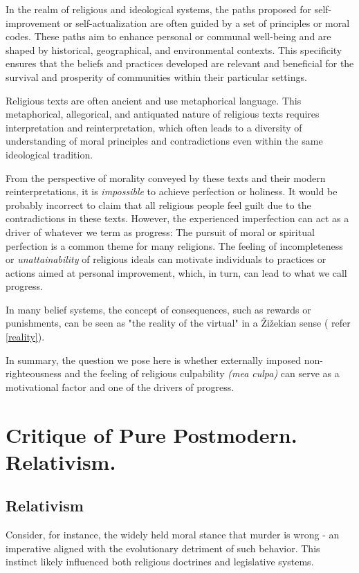 \documentclass[11pt,a4]{article}
\begin{document}
    In the realm of religious and ideological systems, the paths proposed for self-improvement or
    self-actualization are often guided by a set of principles or moral codes. These paths aim to
    enhance personal or communal well-being and are shaped by historical, geographical,
    and environmental contexts. This specificity ensures that the beliefs and practices developed
    are relevant and beneficial for the survival and prosperity of communities within their particular settings.

    Religious texts are often ancient and use metaphorical language. This metaphorical, allegorical, and antiquated nature of religious texts requires interpretation and reinterpretation, which often leads to a diversity of understanding of moral principles and contradictions even within the same ideological tradition.

    From the perspective of morality conveyed by these texts and their modern reinterpretations, it is \textit{impossible} to achieve perfection or holiness. It would be probably incorrect to claim that all religious people feel guilt due to the contradictions in these texts. However, the experienced imperfection can act as a driver of whatever we term as progress: The pursuit of moral or spiritual perfection is a common theme for many religions. The feeling of incompleteness or \textit{unattainability} of religious ideals can motivate individuals to practices or actions aimed at personal improvement, which, in turn, can lead to what we call progress.

    In many belief systems, the concept of consequences, such as rewards or punishments, can be seen as "the reality of the virtual" in a Žižekian sense ( refer \ref{reality}).

    In summary, the question we pose here is whether externally imposed non-righteousness and the feeling of religious culpability \textit{(mea culpa)} can serve as a motivational factor and one of the drivers of progress.



\newpage
\section{Critique of Pure Postmodern. Relativism.}


\subsection{Relativism}
    Consider, for instance, the widely held moral stance that murder is wrong - an imperative aligned with the evolutionary detriment of such behavior. This instinct likely influenced both religious doctrines and legislative systems.
\end{document}
